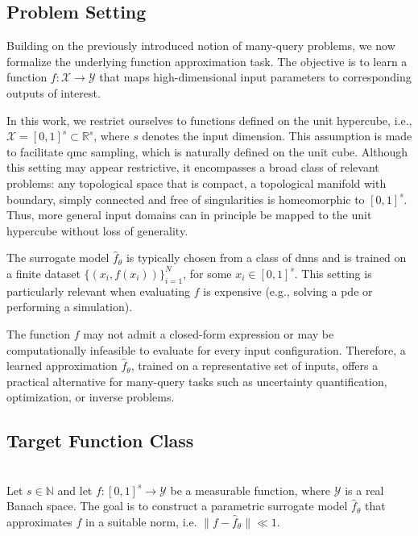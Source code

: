 \subsection{Problem Setting}
\label{subsec:problem-setting}

Building on the previously introduced notion of many-query problems, we now
formalize the underlying function approximation task. The objective is to learn
a function $ f \colon \mathcal{X} \rightarrow \mathcal{Y} $ that maps
high-dimensional input parameters to corresponding outputs of interest.

In this work, we restrict ourselves to functions defined on the unit hypercube,
i.e., $ \mathcal{X} = [0,1]^s \subset \mathbb{R}^s $, where $ s $ denotes the
input dimension. This assumption is made to facilitate \acl{qmc} sampling, which
is naturally defined on the unit cube. Although this setting may appear
restrictive, it encompasses a broad class of relevant problems: any topological
space that is compact, a topological manifold with boundary, simply connected
and free of singularities is homeomorphic to $ [0,1]^s $. Thus, more general
input domains can in principle be mapped to the unit hypercube without loss of
generality.

The surrogate model $ \hat{f}_\theta $ is typically chosen from a class of
\acp{dnn} and is trained on a finite dataset $ \{ (x_i, f(x_i)) \}_{i=1}^N $,
for some $ x_i \in [0,1]^s $. This setting is particularly relevant when
evaluating $ f $ is expensive (e.g., solving a \ac{pde} or performing a
simulation).

\begin{remark}
The function $ f $ may not admit a closed-form expression or may be
computationally infeasible to evaluate for every input configuration. Therefore,
a learned approximation $ \hat{f}_\theta $, trained on a representative set of
inputs, offers a practical alternative for many-query tasks such as uncertainty
quantification, optimization, or inverse problems.
\end{remark}

\subsection{Target Function Class}
\label{subsec:function-class}

\begin{definition} \ \\
Let $ s \in \mathbb{N} $ and let $ f \colon [0,1]^s \rightarrow \mathcal{Y} $ be
a measurable function, where $ \mathcal{Y} $ is a real Banach space. The goal is
to construct a parametric surrogate model $ \hat{f}_\theta $ that approximates $
f $ in a suitable norm, i.e. $ \| f - \hat{f}_\theta \| \ll 1 $.
\end{definition}

